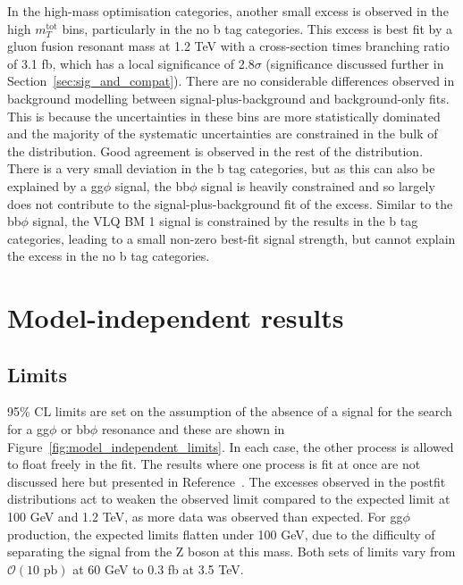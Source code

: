 In the high-mass optimisation categories, another small excess is observed in the high $m_{T}^{\text{tot}}$ bins, particularly in the no b tag categories.
This excess is best fit by a gluon fusion resonant mass at 1.2 TeV with a cross-section times branching ratio of 3.1 fb, which has a local significance of 2.8$\sigma$ (significance discussed further in Section~\ref{sec:sig_and_compat}).
There are no considerable differences observed in background modelling between signal-plus-background and background-only fits.
This is because the uncertainties in these bins are more statistically dominated and the majority of the systematic uncertainties are constrained in the bulk of the distribution.
Good agreement is observed in the rest of the distribution.
There is a very small deviation in the b tag categories, but as this can also be explained by a gg$\phi$ signal, the bb$\phi$ signal is heavily constrained and so largely does not contribute to the signal-plus-background fit of the excess.
Similar to the bb$\phi$ signal, the VLQ BM 1 signal is constrained by the results in the b tag categories, leading to a small non-zero best-fit signal strength, but cannot explain the excess in the no b tag categories.

\section{Model-independent results}

\subsection{Limits}

95\% \ac{CL} limits are set on the assumption of the absence of a signal for the search for a gg$\phi$ or bb$\phi$ resonance and these are shown in Figure~\ref{fig:model_independent_limits}.
In each case, the other process is allowed to float freely in the fit.
The results where one process is fit at once are not discussed here but presented in Reference~\cite{CMS:2022rbd}.
The excesses observed in the postfit distributions act to weaken the observed limit compared to the expected limit at 100 GeV and 1.2 TeV, as more data was observed than expected.
For gg$\phi$ production, the expected limits flatten under 100 GeV, due to the difficulty of separating the signal from the Z boson at this mass.
Both sets of limits vary from $\mathcal{O}(10\text{ pb})$ at 60 GeV to $0.3$ fb at 3.5 TeV. \\

